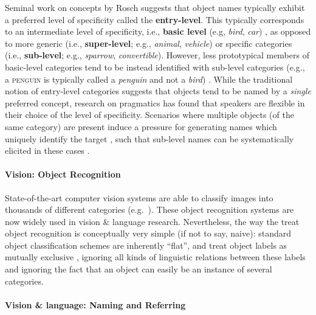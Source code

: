 \documentclass[11pt]{article}
\newcommand{\refexp}[1]{\textsl{#1}}
\newcommand{\cat}[1]{\textsc{#1}}
\begin{document}
 Seminal work on concepts by Rosch suggests that object names typically exhibit a preferred level of specificity called the \textbf{entry-level}. This typically corresponds to an intermediate level of specificity, i.e., \textbf{basic level} (e.g, \refexp{bird}, \refexp{car}) \cite{rosch1976basic}, as opposed to more generic (i.e., \textbf{super-level}; e.g., \refexp{animal}, \refexp{vehicle}) or specific categories (i.e., \textbf{sub-level}; e.g., \refexp{sparrow}, \refexp{convertible}). However, less prototypical members of basic-level categories tend to be instead identified with sub-level categories (e.g., a \cat{penguin} is typically called a \refexp{penguin} and not a \refexp{bird}) \cite{jolicoeur1984pictures}. 
While the traditional notion of entry-level categories suggests that objects tend to be named by a \refexp{single} preferred concept, research on pragmatics has found that speakers are flexible in  
their choice of the level of specificity. 
Scenarios where multiple objects (of the same category) are present induce a pressure for generating names which uniquely identify the target \cite{olson1970language}, such that sub-level names can be systematically elicited in these cases %
\cite{rohde2012communicating}\cite{graf2016animal}.

\paragraph{Vision: Object Recognition}

State-of-the-art computer vision systems are able to classify images into thousands of different categories (e.g.\  ). These object recognition systems are now widely used in vision \& language research.
Nevertheless, the way the treat object recognition is conceptually very simple (if not to say, naive):  standard object classification schemes are inherently ``flat'', and treat object labels as mutually exclusive \cite{deng2014large}, ignoring all kinds of linguistic relations between these labels and ignoring the fact that an object can easily be an instance of several categories.


\paragraph{Vision \& language: Naming and Referring}
\end{document}
